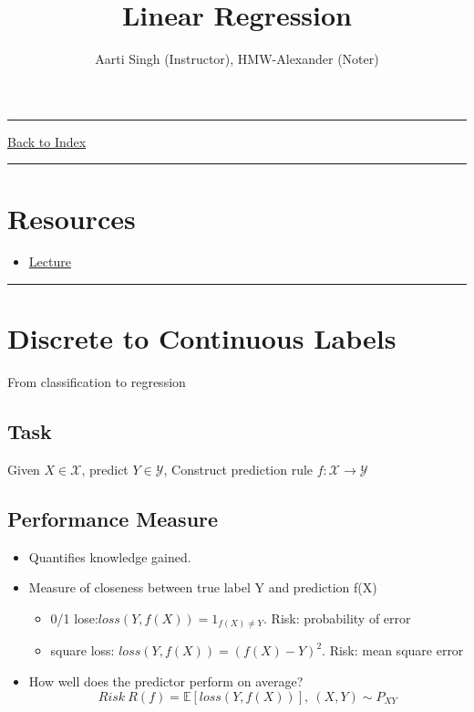 \documentclass[letterpaper,10pt]{article}
\title{\textbf{Linear Regression}}
\author{Aarti Singh (Instructor), HMW-Alexander (Noter)}
\newcommand{\panhline}{\begin{center}\rule{\textwidth}{1pt}\end{center}}
\begin{document}
\maketitle

\panhline
\href{../index.html}{Back to Index}

\panhline
\tableofcontents

\section*{Resources}

\begin{itemize}
	\item \href{../../Lectures/05_LinearLogisticRegression.pdf}{Lecture}
\end{itemize}

\panhline

\section{Discrete to Continuous Labels}
	
From classification to regression

\subsection{Task}

Given $X\in \mathcal{X}$, predict $Y \in \mathcal{Y}$, Construct prediction rule $f:\mathcal{X} \rightarrow \mathcal{Y}$

\subsection{Performance Measure}

\begin{itemize}
	\item Quantifies knowledge gained.
	\item Measure of closeness between true label Y and prediction f(X)
	\begin{itemize}
		\item 0/1 lose:$loss(Y,f(X))=1_{f(X)\neq Y}$. Risk: probability of error 
		\item square loss: $loss(Y,f(X))=(f(X)-Y)^2$. Risk: mean square error
	\end{itemize}
	\item How well does the predictor perform on average?
	$$Risk~R(f)=\mathbb{E}[loss(Y,f(X))],~(X,Y)\sim P_{XY}$$
\end{itemize}
\end{document}
